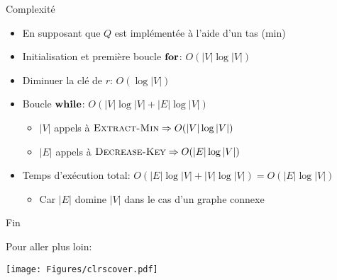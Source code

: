 \begin{frame}{Complexité}

\begin{itemize}
\item En supposant que $Q$ est implémentée à l'aide d'un tas (min)
\item Initialisation et première boucle $\textbf{for}$: $O(|V|\log|V|)$
\item Diminuer la clé de $r$: $O(\log |V|)$
\item Boucle $\textbf{while}$: $O(|V|\log|V|+|E|\log |V|)$
\begin{itemize}
\item $|V|$ appels à $\textnormal{\scshape Extract-Min} \Rightarrow O(|V|\log |V|)$
\item $|E|$ appels à $\textnormal{\scshape Decrease-Key} \Rightarrow O(|E|\log|V|)$
\end{itemize}
\item Temps d'exécution total: $O(|E|\log |V|+|V|\log|V|) = O(|E|\log |V|)$
\begin{itemize}
\item Car $|E|$ domine $|V|$ dans le cas d'un graphe connexe
\end{itemize}
\end{itemize}

\end{frame}

\begin{frame}

\centerline{Fin}

\bigskip

Pour aller plus loin:\\
\centerline{\texttt{[image: Figures/clrscover.pdf]}}

\end{frame}
